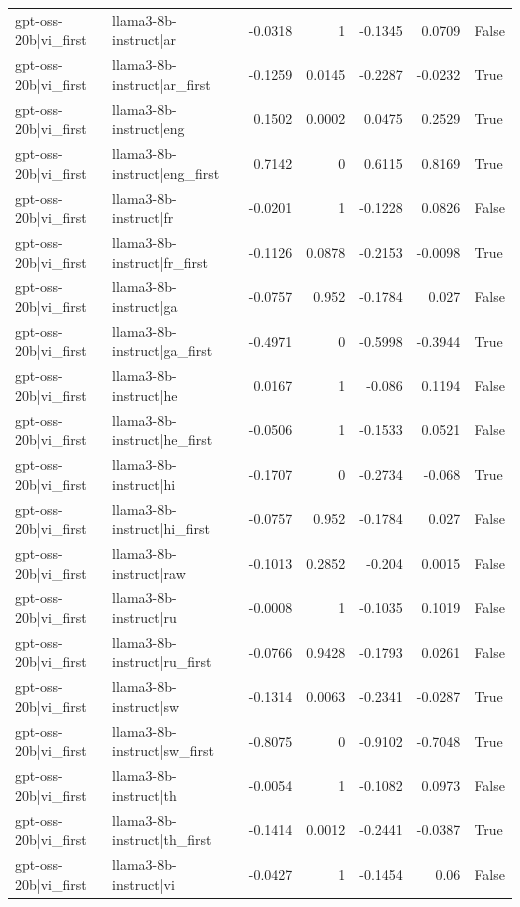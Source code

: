 \begin{table}
\begin{tabular}{l l r r r r l}
gpt-oss-20b|vi_first & llama3-8b-instruct|ar & -0.0318 & 1 & -0.1345 & 0.0709 & False \\
gpt-oss-20b|vi_first & llama3-8b-instruct|ar_first & -0.1259 & 0.0145 & -0.2287 & -0.0232 & True \\
gpt-oss-20b|vi_first & llama3-8b-instruct|eng & 0.1502 & 0.0002 & 0.0475 & 0.2529 & True \\
gpt-oss-20b|vi_first & llama3-8b-instruct|eng_first & 0.7142 & 0 & 0.6115 & 0.8169 & True \\
gpt-oss-20b|vi_first & llama3-8b-instruct|fr & -0.0201 & 1 & -0.1228 & 0.0826 & False \\
gpt-oss-20b|vi_first & llama3-8b-instruct|fr_first & -0.1126 & 0.0878 & -0.2153 & -0.0098 & True \\
gpt-oss-20b|vi_first & llama3-8b-instruct|ga & -0.0757 & 0.952 & -0.1784 & 0.027 & False \\
gpt-oss-20b|vi_first & llama3-8b-instruct|ga_first & -0.4971 & 0 & -0.5998 & -0.3944 & True \\
gpt-oss-20b|vi_first & llama3-8b-instruct|he & 0.0167 & 1 & -0.086 & 0.1194 & False \\
gpt-oss-20b|vi_first & llama3-8b-instruct|he_first & -0.0506 & 1 & -0.1533 & 0.0521 & False \\
gpt-oss-20b|vi_first & llama3-8b-instruct|hi & -0.1707 & 0 & -0.2734 & -0.068 & True \\
gpt-oss-20b|vi_first & llama3-8b-instruct|hi_first & -0.0757 & 0.952 & -0.1784 & 0.027 & False \\
gpt-oss-20b|vi_first & llama3-8b-instruct|raw & -0.1013 & 0.2852 & -0.204 & 0.0015 & False \\
gpt-oss-20b|vi_first & llama3-8b-instruct|ru & -0.0008 & 1 & -0.1035 & 0.1019 & False \\
gpt-oss-20b|vi_first & llama3-8b-instruct|ru_first & -0.0766 & 0.9428 & -0.1793 & 0.0261 & False \\
gpt-oss-20b|vi_first & llama3-8b-instruct|sw & -0.1314 & 0.0063 & -0.2341 & -0.0287 & True \\
gpt-oss-20b|vi_first & llama3-8b-instruct|sw_first & -0.8075 & 0 & -0.9102 & -0.7048 & True \\
gpt-oss-20b|vi_first & llama3-8b-instruct|th & -0.0054 & 1 & -0.1082 & 0.0973 & False \\
gpt-oss-20b|vi_first & llama3-8b-instruct|th_first & -0.1414 & 0.0012 & -0.2441 & -0.0387 & True \\
gpt-oss-20b|vi_first & llama3-8b-instruct|vi & -0.0427 & 1 & -0.1454 & 0.06 & False \\

\end{tabular}
\end{table}
